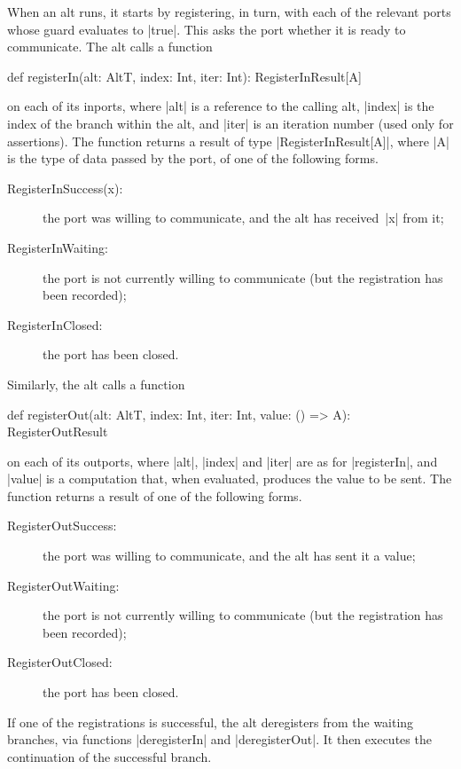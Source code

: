 When an alt runs, it starts by registering, in turn, with each of the relevant
ports whose guard evaluates to |true|.  This asks the port whether it is ready
to communicate.  The alt calls a function
%
\begin{scala}
def registerIn(alt: AltT, index: Int, iter: Int): RegisterInResult[A]  
\end{scala}
%
on each of its inports, where |alt| is a reference to the calling alt, |index|
is the index of the branch within the alt, and |iter| is an iteration number
(used only for assertions).  The function returns a result of type
|RegisterInResult[A]|, where |A| is the type of data passed by the port, of
one of the following forms.
%
\begin{description}
\item[\rm{\scalastyle RegisterInSuccess(x)}:] the port was willing to
  communicate, and the alt has received~|x| from it;

\item[\rm{\scalastyle RegisterInWaiting}:] the port is not currently willing to
  communicate (but the registration has been recorded); 

\item[\rm{\scalastyle RegisterInClosed}:] the port has been closed.
\end{description}
%
Similarly, the alt calls a function
%
\begin{scala}
def registerOut(alt: AltT, index: Int, iter: Int, value: () => A): RegisterOutResult
\end{scala}
on each of its outports, where |alt|, |index| and |iter| are as for
|registerIn|, and |value| is a computation that, when evaluated, produces the
value to be sent.  The function returns a result of one of the following
forms.
%
\begin{description}
\item[\rm{\scalastyle RegisterOutSuccess}:] the port was willing to
  communicate, and the alt has sent it a value;

\item[\rm{\scalastyle RegisterOutWaiting}:] the port is not currently willing to
  communicate (but the registration has been recorded); 

\item[\rm{\scalastyle RegisterOutClosed}:] the port has been closed.
\end{description}

If one of the registrations is successful, the alt deregisters from the
waiting branches, via functions |deregisterIn| and |deregisterOut|.  It then
executes the continuation of the successful branch.  

